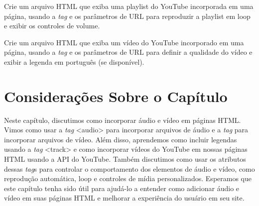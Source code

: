 \begin{exercise}
Crie um arquivo HTML que exiba uma playlist do YouTube incorporada em uma página, usando a \textit{tag}  e os parâmetros de URL para reproduzir a playlist em loop e exibir os controles de volume.
\end{exercise}

\begin{exercise}
Crie um arquivo HTML que exiba um vídeo do YouTube incorporado em uma página, usando a \textit{tag}  e os parâmetros de URL para definir a qualidade do vídeo e exibir a legenda em português (se disponível).
\end{exercise}

\section{Considerações Sobre o Capítulo}

Neste capítulo, discutimos como incorporar áudio e vídeo em páginas HTML. Vimos como usar a \textit{tag} <audio> para incorporar arquivos de áudio e a \textit{tag}  para incorporar arquivos de vídeo. Além disso, aprendemos como incluir legendas usando a \textit{tag} <track> e como incorporar vídeos do YouTube em nossas páginas HTML usando a API do YouTube. Também discutimos como usar os atributos dessas \textit{tag}s para controlar o comportamento dos elementos de áudio e vídeo, como reprodução automática, loop e controles de mídia personalizados. Esperamos que este capítulo tenha sido útil para ajudá-lo a entender como adicionar áudio e vídeo em suas páginas HTML e melhorar a experiência do usuário em seu site.